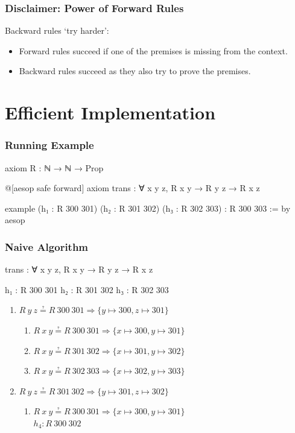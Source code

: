 \begin{frame}
  \frametitle{Disclaimer: Power of Forward Rules}
  Backward rules \enquote*{try harder}:
  \begin{itemize}
    \item<2-> Forward rules {} succeed if one of the premises is missing from the context.
    \item<3-> Backward rules {} succeed as they also try to prove the premises.
  \end{itemize}
\end{frame}




\section{Efficient Implementation}

\begin{frame}[fragile]
  \frametitle{Running Example}

  \begin{leancode}
    axiom R : ℕ → ℕ → Prop

    @[aesop safe forward]
    axiom trans : ∀ x y z, R x y → R y z → R x z

    example
        (h₁ : R 300 301)
        (h₂ : R 301 302)
        (h₃ : R 302 303) :
        R 300 303 := by
      aesop
  \end{leancode}
\end{frame}

\begin{frame}[fragile]
  \frametitle{Naive Algorithm}

  \begin{leancode}
    trans : ∀ x y z, R x y → R y z → R x z

    h₁ : R 300 301
    h₂ : R 301 302
    h₃ : R 302 303
  \end{leancode}

  \begin{enumerate}[<+->]
    \item $R~y~z ≟ R~300~301 ⇒ \{y ↦ 300, z ↦ 301\}$ \good
          \begin{enumerate}[<+->]
            \item $R~x~y ≟ R~300~301 ⇒ \{x ↦ 300, y ↦ 301\}$ \bad
            \item $R~x~y ≟ R~301~302 ⇒ \{x ↦ 301, y ↦ 302\}$ \bad
            \item $R~x~y ≟ R~302~303 ⇒ \{x ↦ 302, y ↦ 303\}$ \bad
          \end{enumerate}
    \item $R~y~z ≟ R~301~302 ⇒ \{y ↦ 301, z ↦ 302\}$ \good
          \begin{enumerate}[<+->]
            \item $R~x~y ≟ R~300~301 ⇒ \{x ↦ 300, y ↦ 301\}$ \good \\
                   $h_{4} : R~300~302$
          \end{enumerate}
  \end{enumerate}
\end{frame}

